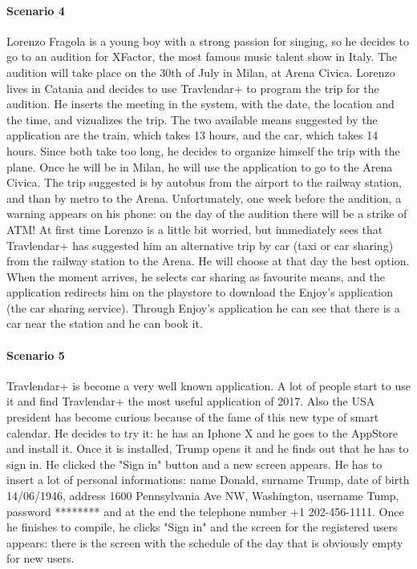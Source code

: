 \documentclass[12pt,titlepage]{article}
\begin{document}
\paragraph{Scenario 4}
Lorenzo Fragola is a young boy with a strong passion for singing, so he decides to go to an audition for XFactor, the most famous music talent show in Italy. The audition will take place on the 30th of July in Milan, at Arena Civica. Lorenzo lives in Catania and decides to use Travlendar+ to program the trip for the audition. He inserts the meeting in the system, with the date, the location and the time, and vizualizes the trip. The two available means suggested by the application are the train, which takes 13 hours, and the car, which takes 14 hours. Since both take too long, he decides to organize himself the trip with the plane. Once he will be in Milan, he will use the application to go to the Arena Civica. The trip suggested is by autobus from the airport to the railway station, and than by metro to the Arena. Unfortunately, one week before the audition, a warning appears on his phone: on the day of the audition there will be a strike of ATM! At first time Lorenzo is a little bit worried, but immediately sees that Travlendar+ has suggested him an alternative trip by car (taxi or car sharing) from the railway station to the Arena. He will choose at that day the best option. When the moment arrives, he selects car sharing as favourite means, and the application redirects him on the playstore to download the Enjoy's application (the car sharing service). Through Enjoy's application he can see that there is a car near the station and he can book it.

\paragraph{Scenario 5}
Travlendar+ is become a very well known application. A lot of people start to use it and find Travlendar+ the most useful application of 2017. 
Also the USA president has become curious because of the fame of this new type of smart calendar. He decides to try it: he has an Iphone X and he goes to the AppStore and install it.
Once it is installed, Trump opens it and he finds out that he has to sign in. He clicked the "Sign in" button and a new screen appears. 
He has to insert a lot of personal informations: name Donald, surname Trump, date of birth 14/06/1946, address 1600 Pennsylvania Ave NW, Washington, username Tump, password ******** and at the end the telephone number +1 202-456-1111.
Once he finishes to compile, he clicks "Sign in" and the screen for the registered users appears: there is the screen with the schedule of the day that is obviously empty for new users.
\end{document}
